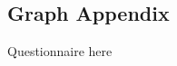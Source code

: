\setcounter{secnumdepth}{-1}

\begin{appendices}

\section{Graph Appendix}
\label{appendix:teachersquestions}
Questionnaire here
\end{appendices}
